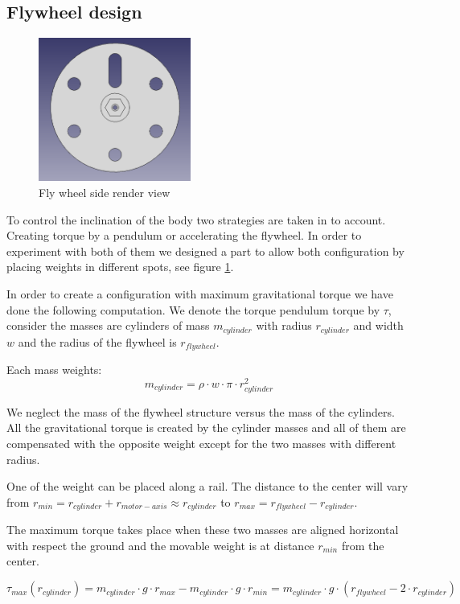 \subsection{Flywheel design} \label{sec: flywheel design}
\begin{figure}
	\centering
	\includegraphics[width=5cm]{img/fly_wheel_side.png}
	\caption{Fly wheel side render view}
	\label{fig:Fly wheel side render view}
\end{figure}

To control the inclination of the body two strategies are taken in to account.
Creating torque by a pendulum or accelerating the flywheel.
In order to experiment with both of them we designed a part to allow
 both configuration by placing weights in different spots, see figure
 \ref{fig:Fly wheel side render view}.

In order to create a configuration with maximum gravitational torque
we have done the following computation. We denote the torque pendulum
torque by $\tau$, consider the masses are cylinders of mass $m_{cylinder}$
with radius $r_{cylinder}$ and width $w$ and the radius of the flywheel is $r_{flywheel}$.

Each mass weights:
\[ m_{cylinder} = \rho \cdot w \cdot \pi \cdot r_{cylinder}^2 \]

We neglect the mass of the flywheel structure versus the mass of the cylinders. All
the gravitational torque is created by the cylinder masses and all of them are compensated
with the opposite weight except for the two masses with different radius.

One of the weight can be placed along a rail. The distance to the center will
vary from $r_{min} = r_{cylinder} + r_{motor-axis} \approx r_{cylinder} $ to $r_{max} = r_{flywheel} - r_{cylinder}$. 

The maximum torque takes place when these two masses are aligned horizontal with respect the ground and the movable weight is at distance $r_{min}$ from the center.

\[ \tau _{max} (r_{cylinder}) =  m_{cylinder} \cdot g \cdot r_{max} -  m_{cylinder} \cdot g \cdot r_{min} =
 m_{cylinder}\cdot g \cdot (r_{flywheel} - 2 \cdot r_{cylinder}) \]

